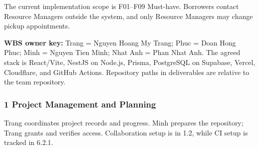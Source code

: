 \documentclass[11pt]{article}
\renewcommand{\arraystretch}{1.18}
\begin{document}
The current implementation scope is F01--F09 Must-have. Borrowers contact Resource Managers outside the system, and only Resource Managers may change pickup appointments.

\textbf{WBS owner key:} Trang = Nguyen Hoang My Trang; Phuc = Doan Hong Phuc; Minh = Nguyen Tien Minh; Nhat Anh = Phan Nhat Anh. The agreed stack is React/Vite, NestJS on Node.js, Prisma, PostgreSQL on Supabase, Vercel, Cloudflare, and GitHub Actions. Repository paths in deliverables are relative to the team repository.

\subsubsection*{1 Project Management and Planning}
Trang coordinates project records and progress. Minh prepares the repository; Trang grants and verifies access. Collaboration setup is in 1.2, while CI setup is tracked in 6.2.1.
\footnotesize\setlength{\tabcolsep}{2.5pt}\renewcommand{\arraystretch}{1.08}
\end{document}
